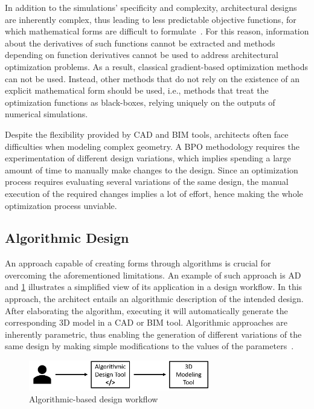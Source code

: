 	In addition to the simulations' specificity and complexity, architectural designs are inherently complex, thus leading to less predictable objective functions, for which mathematical forms are difficult to formulate~\cite{Machairas2014}. For this reason, information about the derivatives of such functions cannot be extracted and methods depending on function derivatives cannot be used to address architectural optimization problems. As a result, classical gradient-based optimization methods can not be used. Instead, other methods that do not rely on the existence of an explicit mathematical form should be used, i.e., methods that treat the optimization functions as black-boxes, relying uniquely on the outputs of numerical simulations.
	
	Despite the flexibility provided by \ac{CAD} and \ac{BIM} tools, architects often face difficulties when modeling complex geometry. A \ac{BPO} methodology requires the experimentation of different design variations, which implies spending a large amount of time to manually make changes to the design. Since an optimization process requires evaluating several variations of the same design, the manual execution of the required changes implies a lot of effort, hence making the whole optimization process unviable.
	
\subsection{Algorithmic Design}

	An approach capable of creating forms through algorithms is crucial for overcoming the aforementioned limitations. An example of such approach is \ac{AD}~\cite{Branco2017AD} and \cref{fig:algorithmicdesign} illustrates a simplified view of its application in a design workflow. In this approach, the architect entails an algorithmic description of the intended design. After elaborating the algorithm, executing it will automatically generate the corresponding 3D model in a \ac{CAD} or \ac{BIM} tool. Algorithmic approaches are inherently parametric, thus enabling the generation of different variations of the same design by making simple modifications to the values of the parameters~\cite{Leitao2014GD}. 
	
\begin{figure}[htbp]
\centering
\includegraphics[width=0.70\textwidth]{./Images/Introduction/AlgorithmicArchitecturalDesign.png}
\caption[General view of the Algorithmic Design Approach]{Algorithmic-based design workflow}
\label{fig:algorithmicdesign}
\end{figure}
	
